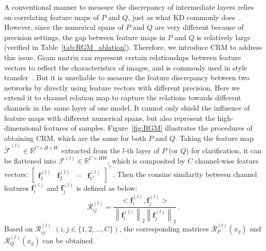 \documentclass[final]{cvpr}
\begin{document}
A conventional manner to measure the discrepancy of intermediate layers relies on correlating feature maps of $P$ and $Q$, just as what KD commonly does~\cite{RomeroBKCGB14,zagoruyko2016paying}.
However, since the numerical spans of $P$ and $Q$ are very different because of precision settings, the gap between feature maps in $P$ and $Q$ is relatively large (verified in Table~\ref{tab:RGM_ablation}).
Therefore, we introduce CRM to address this issue.
Gram matrix can represent certain relationships between feature vectors to reflect the characteristics of images, and is commonly used in style transfer~\cite{gatys2015neural}. But it is unreliable to measure the feature discrepancy between two networks by directly using feature vectors with different precision. 
Here we extend it to channel relation map to capture the relations towards different channels in the same layer of one model.
It cannot only shield the influence of feature maps with different numerical spans, but also represent the high-dimensional features of samples.
Figure~\ref{fig:RGM} illustrates the procedures of obtaining CRM, which are the same for both $P$ and $Q$.
Taking the feature map $\mathcal{\tilde{F}}^{(l)} \in \mathbb{R}^{C\times H \times W}$ extracted from the $l$-th layer of $P$ (or $Q$) for clarification, it can be flattened into $\mathcal{F}^{(l)} \in \mathbb{R}^{C\times HW}$, which is composited by $C$ channel-wise feature vectors: $\begin{bmatrix} \bm{f}^{(l)}_{1} & \bm{f}^{(l)}_{2} & \cdots & \bm{f}^{(l)}_{C} \end{bmatrix}^{\top}$.
Then the consine similarity between channel features $\bm{f}^{(l)}_i$ and $\bm{f}^{(l)}_j$ is defined as below:
\begin{equation}
\label{eq:rgm}
  \mathcal{R}^{(l)}_{ij}=\frac{ <\bm{f}^{(l)}_i, \bm{f}^{(l)}_j> }{\left\| \bm{f}^{(l)}_i \right\|_2 \left\| \bm{f}^{(l)}_j \right\|_2 } \,.
\end{equation}
Based on $\mathcal{R}^{(l)}_{ij}$ $(i, j\in \{1,2,\dots,C\})$, the corresponding matrices $\mathcal{R}^{(l)}_{P}(x_g)$ and $\mathcal{R}^{(l)}_{Q}(x_g)$ can be obtained. 
\end{document}
